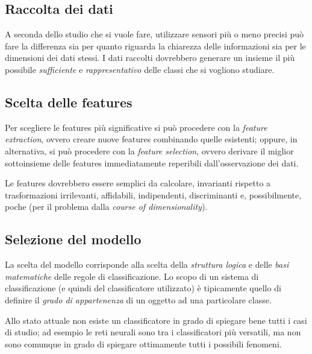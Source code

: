 \documentclass[a4paper,oneside,titlepage]{book}
\begin{document}
\subsection{Raccolta dei dati}
A seconda dello studio che si vuole fare, utilizzare sensori più o meno precisi può fare la differenza sia per quanto riguarda la chiarezza delle informazioni sia per le dimensioni dei dati stessi. I dati raccolti dovrebbero generare un insieme il più possibile \textit{sufficiente} e \textit{rappresentativo} delle classi che si vogliono studiare.

\subsection{Scelta delle features}
Per scegliere le features più significative si può procedere con la \textit{feature extraction}, ovvero creare nuove features combinando quelle esistenti; oppure, in alternativa, si può procedere con la \textit{feature selection}, ovvero derivare il miglior sottoinsieme delle features immediatamente reperibili dall'osservazione dei dati. 

Le features dovrebbero essere semplici da calcolare, invarianti rispetto a trasformazioni irrilevanti, affidabili, indipendenti, discriminanti e, possibilmente, poche (per il problema dalla \textit{course of dimensionality}).

\subsection{Selezione del modello}
La scelta del modello corrisponde alla scelta della \textit{struttura logica} e delle \textit{basi matematiche} delle regole di classificazione. Lo scopo di un sistema di classificazione (e quindi del classificatore utilizzato) è tipicamente quello di definire il \textit{grado di appartenenza} di un oggetto ad una particolare classe.

Allo stato attuale non esiste un classificatore in grado di spiegare bene tutti i casi di studio; ad esempio le reti neurali sono tra i classificatori più versatili, ma non sono comunque in grado di spiegare ottimamente tutti i possibili fenomeni.
\end{document}
